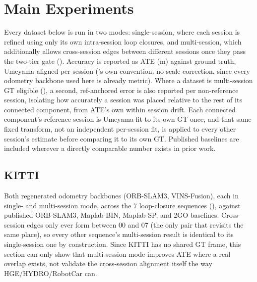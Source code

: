 \clearpage

\section{Main Experiments}
\label{sec:experiments-main}

Every dataset below is run in two modes: single-session, where each session is refined
using only its own intra-session loop closures, and multi-session, which additionally
allows cross-session edges between different sessions once they pass the two-tier gate
(). Accuracy is reported as ATE (m) against ground truth, Umeyama-aligned
per session ('s own convention, no scale correction, since every
odometry backbone used here is already metric). Where a dataset is multi-session GT eligible
(), a second, ref-anchored error is also
reported per non-reference session, isolating how accurately a session was placed relative to the
rest of its connected component, from ATE's own within session drift. Each connected component's reference session is Umeyama-fit to its own GT once, and that same fixed transform, not an independent per-session fit, is applied to every other session's estimate before comparing it to its own GT. Published
baselines are included wherever a directly comparable number exists in prior work.

\subsection{KITTI}
\label{sec:experiments-main-kitti}

Both regenerated odometry backbones (ORB-SLAM3, VINS-Fusion), each in single- and multi-session
mode, across the 7 loop-closure sequences (), against published
ORB-SLAM3, Maplab-BIN, Maplab-SP, and 2GO baselines. Cross-session edges only ever form between
00 and 07 (the only pair that revisits the same place), so every other sequence's multi-session
result is identical to its single-session one by construction. Since KITTI has no shared GT frame,
this section can only show that multi-session mode improves ATE where a real overlap exists, not
validate the cross-session alignment itself the way HGE/HYDRO/RobotCar can.

